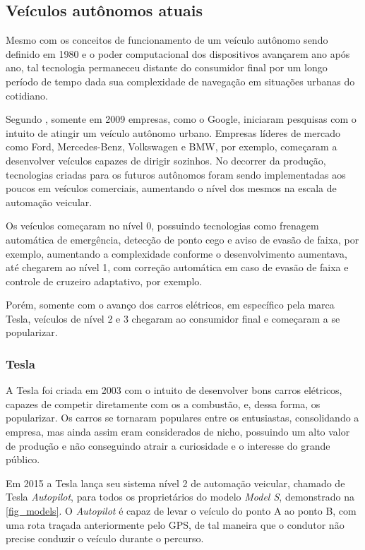 \subsection{Ve{\'i}culos aut{\^o}nomos atuais}

Mesmo com os conceitos de funcionamento de um veículo autônomo sendo definido
em 1980 e o poder computacional dos dispositivos avançarem ano após ano, tal
tecnologia permaneceu distante do consumidor final por um longo período de
tempo dada sua complexidade de navegação em situações urbanas do cotidiano. 

Segundo , somente em 2009 empresas, como o Google, iniciaram
pesquisas com o intuito de atingir um veículo autônomo urbano. Empresas líderes
de mercado como Ford, Mercedes-Benz, Volkswagen e BMW, por exemplo, começaram a
desenvolver veículos capazes de dirigir sozinhos. No decorrer da
produção, tecnologias criadas para os futuros autônomos foram sendo
implementadas aos poucos em veículos comerciais, aumentando o nível dos mesmos
na escala de automação veicular.

Os veículos começaram no nível 0, possuindo tecnologias como frenagem
automática de emergência, detecção de ponto cego e aviso de evasão de faixa,
por exemplo, aumentando a complexidade conforme o desenvolvimento aumentava,
até chegarem ao nível 1, com correção automática em caso de evasão de faixa e
controle de cruzeiro adaptativo, por exemplo.

Porém, somente com o avanço dos carros elétricos, em específico pela marca
Tesla, veículos de nível 2 e 3 chegaram ao consumidor final e começaram a se
popularizar.

\subsubsection{Tesla}

A Tesla foi criada em 2003 com o intuito de desenvolver bons carros elétricos,
capazes de competir diretamente com os a combustão, e, dessa forma, os
popularizar.  Os carros se tornaram populares entre os entusiastas,
consolidando a empresa, mas ainda assim eram considerados de nicho, possuindo um
alto valor de produção e não conseguindo atrair a curiosidade e o interesse do
grande público.

Em 2015 a Tesla lança seu sistema nível 2 de automação veicular, chamado de
Tesla \textit{Autopilot}, para todos os proprietários do modelo \textit{Model
S}, demonstrado na \autoref{fig_models}. O \textit{Autopilot} é capaz de levar
o veículo do ponto A ao ponto B, com uma rota traçada anteriormente pelo GPS,
de tal maneira que o condutor não precise conduzir o veículo durante o percurso. 

